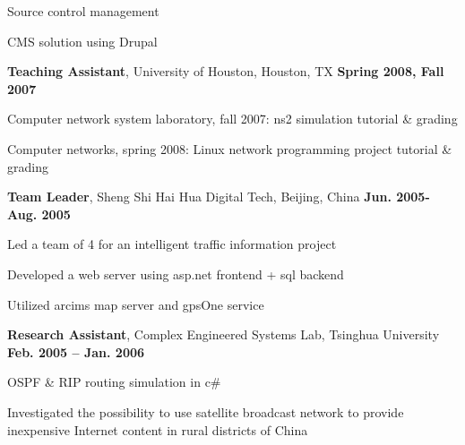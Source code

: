 \documentclass[overlapped, line]{resume}
\begin{document}
\begin{resume}
\begin{list2}
\begin{list2}
           \item Source control management
           \item CMS solution using Drupal
           \end{list2}
         \end{list2}  \vspace{-5pt}
         {\bf Teaching Assistant}, University of Houston, Houston, TX \hfill {\bf Spring 2008, Fall 2007}\\
         \vspace{-10pt}      %
         \begin{list2}
         \item Computer network system laboratory, fall 2007: ns2 simulation tutorial \& grading
         \item Computer networks, spring 2008: Linux network programming project tutorial \& grading
         \end{list2}  \vspace{-5pt}

         {\bf Team Leader}, Sheng Shi Hai Hua Digital Tech, Beijing, China \hfill {\bf Jun. 2005-Aug. 2005}\\
         \vspace{-10pt}      %
         \begin{list2}
         \item Led a team of 4 for an intelligent traffic information project
         \item Developed a web server using asp.net frontend + sql backend
         \item Utilized arcims map server and gpsOne service
         \end{list2}  \vspace{-5pt}

         {\bf Research Assistant}, Complex Engineered Systems Lab, Tsinghua University \hfill {\bf Feb. 2005 -- Jan. 2006}\\
         \vspace{-10pt}      %
         \begin{list2}
         \item OSPF \& RIP routing simulation in c\#
         \item Investigated the possibility to use satellite broadcast network to provide inexpensive Internet content in rural districts of China
         \end{list2}  \vspace{-5pt}


\end{resume}
\end{document}
